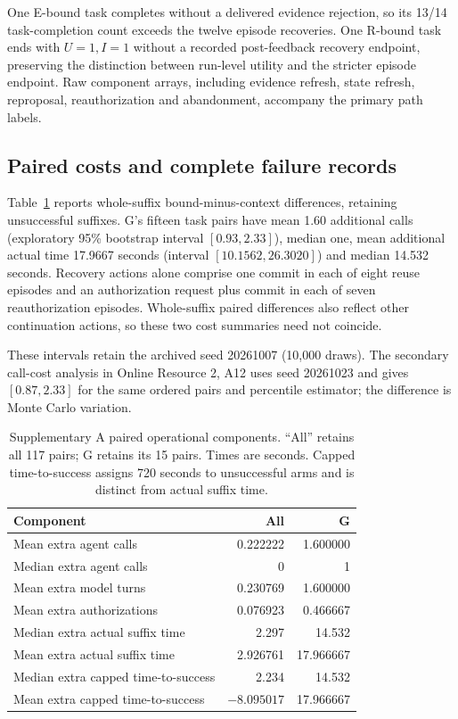 \documentclass[11pt,a4paper]{article}
\begin{document}
One E-bound task completes without a delivered evidence rejection, so its 13/14 task-completion count exceeds the twelve episode recoveries. One R-bound task ends with $U=1,I=1$ without a recorded post-feedback recovery endpoint, preserving the distinction between run-level utility and the stricter episode endpoint. Raw component arrays, including evidence refresh, state refresh, reproposal, reauthorization and abandonment, accompany the primary path labels.

\subsection{Paired costs and complete failure records}
Table~\ref{tab:supplementary-friction} reports whole-suffix bound-minus-context differences, retaining unsuccessful suffixes. G's fifteen task pairs have mean 1.60 additional calls (exploratory 95\% bootstrap interval $[0.93,2.33]$), median one, mean additional actual time 17.9667 seconds (interval $[10.1562,26.3020]$) and median 14.532 seconds. Recovery actions alone comprise one commit in each of eight reuse episodes and an authorization request plus commit in each of seven reauthorization episodes. Whole-suffix paired differences also reflect other continuation actions, so these two cost summaries need not coincide.

These intervals retain the archived seed 20261007 (10,000 draws). The secondary call-cost analysis in Online Resource 2, A12 uses seed 20261023 and gives $[0.87,2.33]$ for the same ordered pairs and percentile estimator; the difference is Monte Carlo variation.

\begin{table}[htbp]
\centering\small
\caption{Supplementary A paired operational components. ``All'' retains all 117 pairs; G retains its 15 pairs. Times are seconds. Capped time-to-success assigns 720 seconds to unsuccessful arms and is distinct from actual suffix time.}\label{tab:supplementary-friction}
\begin{tabular}{@{}lrr@{}}
\toprule
Component & All & G \\
\midrule
Mean extra agent calls & 0.222222 & 1.600000 \\
Median extra agent calls & 0 & 1 \\
Mean extra model turns & 0.230769 & 1.600000 \\
Mean extra authorizations & 0.076923 & 0.466667 \\
Median extra actual suffix time & 2.297 & 14.532 \\
Mean extra actual suffix time & 2.926761 & 17.966667 \\
Median extra capped time-to-success & 2.234 & 14.532 \\
Mean extra capped time-to-success & $-8.095017$ & 17.966667 \\
\bottomrule
\end{tabular}
\end{table}
\end{document}

